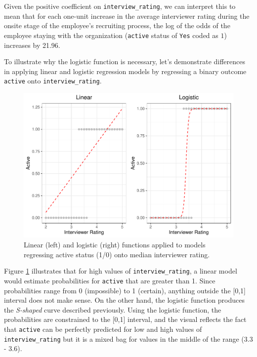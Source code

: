 \documentclass[
]{book}
\begin{document}
Given the positive coefficient on \texttt{interview\_rating}, we can interpret this to mean that for each one-unit increase in the average interviewer rating during the onsite stage of the employee's recruiting process, the log of the odds of the employee staying with the organization (\texttt{active} status of \texttt{Yes} coded as \(1\)) increases by 21.96.

To illustrate why the logistic function is necessary, let's demonstrate differences in applying linear and logistic regression models by regressing a binary outcome \texttt{active} onto \texttt{interview\_rating}.

\begin{figure}

{\centering \includegraphics[width=1\linewidth]{People_Analytics_Lifecycle_files/figure-latex/lm-glm-compare-1} 

}

\caption{Linear (left) and logistic (right) functions applied to models regressing active status (1/0) onto median interviewer rating.}\label{fig:lm-glm-compare}
\end{figure}

Figure \ref{fig:lm-glm-compare} illustrates that for high values of \texttt{interview\_rating}, a linear model would estimate probabilities for \texttt{active} that are greater than 1. Since probabilities range from 0 (impossible) to 1 (certain), anything outside the {[}0,1{]} interval does not make sense. On the other hand, the logistic function produces the \emph{S-shaped} curve described previously. Using the logistic function, the probabilities are constrained to the {[}0,1{]} interval, and the visual reflects the fact that \texttt{active} can be perfectly predicted for low and high values of \texttt{interview\_rating} but it is a mixed bag for values in the middle of the range (3.3 - 3.6).
\end{document}
